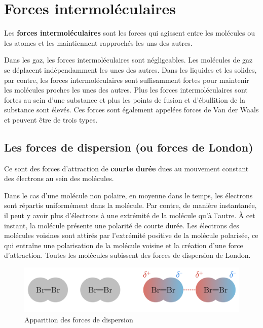 \documentclass[
  11pt,
  a4paper,
  openany]{book}
\begin{document}
\section{Forces intermoléculaires}\label{forces-intermoluxe9culaires}

Les \textbf{forces intermoléculaires} sont les forces qui agissent entre les molécules ou les atomes et les maintiennent rapprochés les uns des autres.

Dans les gaz, les forces intermoléculaires sont négligeables. Les molécules de gaz se déplacent indépendamment les unes des autres. Dans les liquides et les solides, par contre, les forces intermoléculaires sont suffisamment fortes pour maintenir les molécules proches les unes des autres. Plus les forces intermoléculaires sont fortes au sein d'une substance et plus les points de fusion et d'ébullition de la substance sont élevés. Ces forces sont également appelées forces de Van der Waals et peuvent être de trois types.

\subsection{Les forces de dispersion (ou forces de London)}\label{les-forces-de-dispersion-ou-forces-de-london}

Ce sont des forces d'attraction de \textbf{courte durée} dues au mouvement constant des électrons au sein des molécules.

Dans le cas d'une molécule non polaire, en moyenne dans le temps, les électrons sont répartis uniformément dans la molécule. Par contre, de manière instantanée, il peut y avoir plus d'électrons à une extrémité de la molécule qu'à l'autre. À cet instant, la molécule présente une polarité de courte durée. Les électrons des molécules voisines sont attirés par l'extrémité positive de la molécule polarisée, ce qui entraîne une polarisation de la molécule voisine et la création d'une force d'attraction. Toutes les molécules subissent des forces de dispersion de London.

\begin{figure}

{\centering \includegraphics[width=0.67\linewidth]{images/forces-london} 

}

\caption{Apparition des forces de dispersion}\label{fig:forces-london}
\end{figure}
\end{document}
